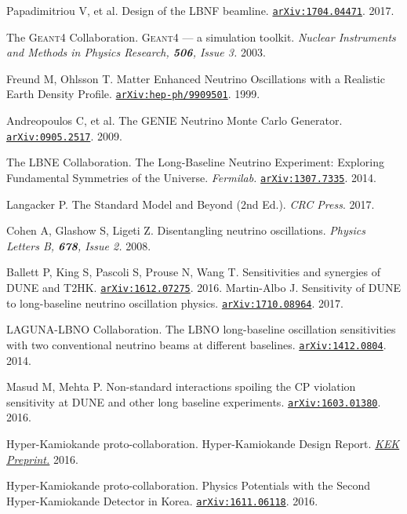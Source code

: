\begin{thebibliography}{100}
	 Papadimitriou V, et al. Design of the LBNF beamline.
		\href{https://arxiv.org/abs/1704.04471}{\texttt{arXiv:1704.04471}}. 2017.

	 The \textsc{Geant4} Collaboration.
		\textsc{Geant4} --- a simulation toolkit. \textit{Nuclear Instruments and Methods in
		Physics Research, \textbf{506}, Issue 3.} 2003. 

	 Freund M, Ohlsson T. Matter Enhanced Neutrino Oscillations
		with a Realistic Earth Density Profile.
		\href{https://arxiv.org/abs/hep-ph/9909501}{\texttt{arXiv:hep-ph/9909501}}.
		1999.

	 Andreopoulos C, et al. The \textsc{GENIE} Neutrino Monte
		Carlo Generator.
		\href{https://arxiv.org/abs/0905.2517}{\texttt{arXiv:0905.2517}}. 2009.

	 The LBNE Collaboration. The Long-Baseline Neutrino Experiment:
		Exploring Fundamental Symmetries of the Universe.
		\textit{Fermilab.}
		\href{https://arxiv.org/abs/1307.7335}{\texttt{arXiv:1307.7335}}. 2014.

	 Langacker P. The Standard Model and Beyond (2nd Ed.).
		\textit{CRC Press}. 2017.

	 Cohen A, Glashow S, Ligeti Z. Disentangling neutrino
		oscillations. \textit{Physics Letters B, \textbf{678}, Issue 2.} 2008.

	 Ballett P, King S, Pascoli S, Prouse N, Wang T.
		Sensitivities and synergies of DUNE and T2HK. \href{
		https://arxiv.org/pdf/1612.07275.pdf}{\texttt{arXiv:1612.07275}}. 2016.
	 Martin-Albo J. Sensitivity of DUNE to long-baseline
		neutrino oscillation physics.
		\href{https://arxiv.org/abs/1710.08964}{\texttt{arXiv:1710.08964}}. 2017.

	 LAGUNA-LBNO Collaboration. The LBNO long-baseline
		oscillation sensitivities with two conventional neutrino beams at different
		baselines.
		\href{https://arxiv.org/abs/1412.0804}{\texttt{arXiv:1412.0804}}. 2014.

	 Masud M, Mehta P. Non-standard interactions spoiling the CP
		violation sensitivity at DUNE and other long baseline experiments.
		\href{https://arxiv.org/abs/1603.01380}{\texttt{arXiv:1603.01380}}. 2016.

	 Hyper-Kamiokande proto-collaboration. Hyper-Kamiokande
		Design Report. \href{http://www.hyperk.org/?p=215}{\textit{KEK Preprint.}}
		2016.

	 Hyper-Kamiokande proto-collaboration. Physics Potentials with
		the Second Hyper-Kamiokande Detector in Korea.
		\href{https://arxiv.org/abs/1611.06118}{\texttt{arXiv:1611.06118}}. 2016.

\end{thebibliography}
